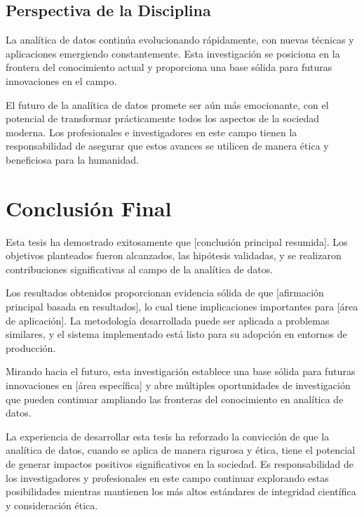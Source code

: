 \subsection{Perspectiva de la Disciplina}

La analítica de datos continúa evolucionando rápidamente, con nuevas técnicas y aplicaciones emergiendo constantemente. Esta investigación se posiciona en la frontera del conocimiento actual y proporciona una base sólida para futuras innovaciones en el campo.

El futuro de la analítica de datos promete ser aún más emocionante, con el potencial de transformar prácticamente todos los aspectos de la sociedad moderna. Los profesionales e investigadores en este campo tienen la responsabilidad de asegurar que estos avances se utilicen de manera ética y beneficiosa para la humanidad.

\section{Conclusión Final}

Esta tesis ha demostrado exitosamente que [conclusión principal resumida]. Los objetivos planteados fueron alcanzados, las hipótesis validadas, y se realizaron contribuciones significativas al campo de la analítica de datos.

Los resultados obtenidos proporcionan evidencia sólida de que [afirmación principal basada en resultados], lo cual tiene implicaciones importantes para [área de aplicación]. La metodología desarrollada puede ser aplicada a problemas similares, y el sistema implementado está listo para su adopción en entornos de producción.

Mirando hacia el futuro, esta investigación establece una base sólida para futuras innovaciones en [área específica] y abre múltiples oportunidades de investigación que pueden continuar ampliando las fronteras del conocimiento en analítica de datos.

La experiencia de desarrollar esta tesis ha reforzado la convicción de que la analítica de datos, cuando se aplica de manera rigurosa y ética, tiene el potencial de generar impactos positivos significativos en la sociedad. Es responsabilidad de los investigadores y profesionales en este campo continuar explorando estas posibilidades mientras mantienen los más altos estándares de integridad científica y consideración ética.

